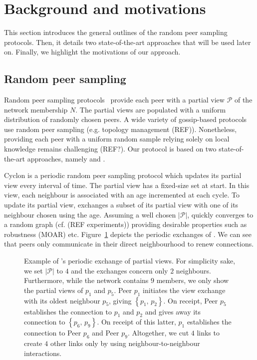 
\section{Background and motivations}
\label{sec:background}

This section introduces the general outlines of the random peer sampling
protocols. Then, it details two state-of-the-art approaches that will be used
later on. Finally, we highlight the motivations of our approach.

\subsection{Random peer sampling}
Random peer sampling protocols~\cite{jelasity2004peer} provide each peer with a
partial view $\mathcal{P}$ of the network membership $N$. The partial views are
populated with a uniform distribution of randomly chosen peers. A wide variety
of gossip-based protocols use random peer sampling (e.g. topology management
(REF)). Nonetheless, providing each peer with a uniform random sample relying
solely on local knowledge remains challenging (REF?).  Our \SCAMPLON{} protocol
is based on two state-of-the-art approaches, namely \SCAMP{} and \CYCLON{}.

\begin{asparadesc}
\item [Cyclon]\cite{voulgaris2005cyclon} is a periodic random peer sampling
  protocol which updates its partial view every interval of time. The partial
  view has a fixed-size set at start. In this view, each neighbour is
  associated with an age incremented at each cycle. To update its partial view,
  \CYCLON{} exchanges a subset of its partial view with one of its neighbour
  chosen using the age.  Assuming a well chosen $|\mathcal{P}|$, \CYCLON{}
  quickly converges to a random graph (cf. (REF experiments)) providing
  desirable properties such as robustness (MOAR) etc.
  Figure~\ref{fig:cyclonexample} depicts the periodic exchanges of
  \CYCLON{}. We can see that peers only communicate in their direct
  neighbourhood to renew connections.
\end{asparadesc}

\begin{figure}
  \centering
  
  \caption{\label{fig:cyclonexample}Example of \CYCLON{}'s periodic exchange of
    partial views. For simplicity sake, we set $|\mathcal{P}|$ to $4$ and the
    exchanges concern only $2$ neighbours. Furthermore, while the network
    contains $9$ members, we only show the partial views of $p_1$ and $p_5$.
    Peer $p_1$ initiates the view exchange with its oldest neighbour $p_5$,
    giving $\left\{p_1,\,p_2\right\}$. On receipt, Peer $p_5$ establishes the
    connection to $p_1$ and $p_2$ and gives away its connection to
    $\left\{p_6,\,p_9\right\}$.  On receipt of this latter, $p_1$ establishes
    the connection to Peer $p_6$ and Peer $p_9$. Altogether, we cut $4$ links
    to create $4$ other links only by using neighbour-to-neighbour
    interactions.}
\end{figure}

